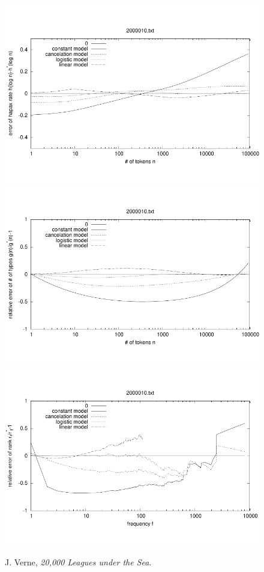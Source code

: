\documentclass[a4paper,12pt]{article}
\begin{document}
\begin{figure}[p]
  \centering
  \vspace{-2em}
  \includegraphics[width=0.8\columnwidth]{output/herdan/2000010_27/token_ratio_residual.pdf}
  \\[-3em]
  \includegraphics[width=0.8\columnwidth]{output/herdan/2000010_27/token_residual.pdf}
  \\[-3em]
  \includegraphics[width=0.8\columnwidth]{output/herdan/2000010_27/frequency_residual.pdf}
  \vspace{-2em}
  \caption{J. Verne, \emph{20,000 Leagues under the Sea}.\label{fig2000010R}}
\end{figure}
\end{document}
